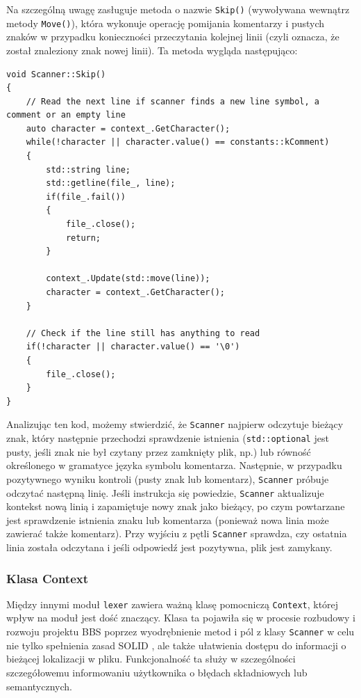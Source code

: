 Na szczególną uwagę zasługuje metoda o nazwie \texttt{Skip()} (wywoływana wewnątrz metody \texttt{Move()}), która wykonuje operację pomijania komentarzy i pustych znaków w przypadku konieczności przeczytania kolejnej linii (czyli oznacza, że został znaleziony znak nowej linii). Ta metoda wygląda następująco:

\begin{lstlisting}[label=list:scanner,caption=Metoda Scanner::Skip(),basicstyle=\footnotesize\ttfamily]
void Scanner::Skip()
{
    // Read the next line if scanner finds a new line symbol, a comment or an empty line
    auto character = context_.GetCharacter();
    while(!character || character.value() == constants::kComment)
    {
        std::string line;
        std::getline(file_, line);
        if(file_.fail())
        {
            file_.close();
            return;
        }
    
        context_.Update(std::move(line));
        character = context_.GetCharacter();
    }
    
    // Check if the line still has anything to read
    if(!character || character.value() == '\0')
    {
        file_.close();
    }
}
\end{lstlisting}

Analizując ten kod, możemy stwierdzić, że \texttt{Scanner} najpierw odczytuje bieżący znak, który następnie przechodzi sprawdzenie istnienia (\texttt{std::optional} jest pusty, jeśli znak nie był czytany przez zamknięty plik, np.) lub równość określonego w gramatyce języka symbolu komentarza. Następnie, w przypadku pozytywnego wyniku kontroli (pusty znak lub komentarz), \texttt{Scanner} próbuje odczytać następną linię. Jeśli instrukcja się powiedzie, \texttt{Scanner} aktualizuje kontekst nową linią i zapamiętuje nowy znak jako bieżący, po czym powtarzane jest sprawdzenie istnienia znaku lub komentarza (ponieważ nowa linia może zawierać także komentarz). Przy wyjściu z pętli \texttt{Scanner} sprawdza, czy ostatnia linia została odczytana i jeśli odpowiedź jest pozytywna, plik jest zamykany.

\subsubsection{Klasa Context}
Między innymi moduł \texttt{lexer} zawiera ważną klasę pomocniczą \texttt{Context}, której wpływ na moduł jest dość znaczący. Klasa ta pojawiła się w procesie rozbudowy i rozwoju projektu BBS poprzez wyodrębnienie metod i pól z klasy \texttt{Scanner} w celu nie tylko spełnienia zasad SOLID \cite{solid}, ale także ułatwienia dostępu do informacji o bieżącej lokalizacji w pliku. Funkcjonalność ta służy w szczególności szczegółowemu informowaniu użytkownika o błędach składniowych lub semantycznych.

